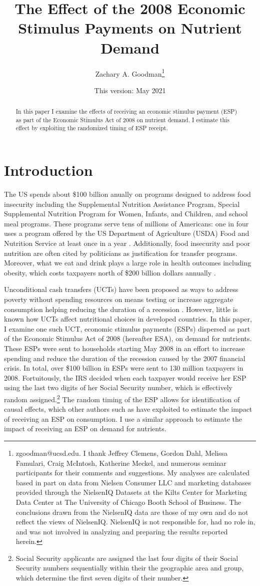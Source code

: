 \documentclass[12pt]{article}
\title{The Effect of the 2008 Economic Stimulus Payments on Nutrient Demand}
\author{Zachary A. Goodman\thanks{zgoodman@ucsd.edu.
I thank Jeffrey Clemens, Gordon Dahl, Melissa Famulari, Craig McIntosh, Katherine Meckel, and numerous seminar participants for their comments and suggestions.
My analyses are calculated based in part on data from Nielsen Consumer LLC and marketing databases provided through the NielsenIQ Datasets at the Kilts Center for Marketing Data Center at The University of Chicago Booth School of Business.
The conclusions drawn from the NielsenIQ data are those of my own and do not reflect the views of NielsenIQ.
NielsenIQ is not responsible for, had no role in, and was not involved in analyzing and preparing the results reported herein.}}
\affil{University of California, San Diego}
\date{This version: May 2021}
\begin{document}
\maketitle

\begin{abstract}
In this paper I examine the effects of receiving an economic stimulus payment (ESP) as part of the Economic Stimulus Act of 2008 on nutrient demand.
I estimate this effect by exploiting the randomized timing of ESP receipt.
\end{abstract}

\pagebreak

\doublespacing

\section{Introduction} \label{introduction}

The US spends about \$100 billion anually on programs designed to address food insecurity including the Supplemental Nutrition Assistance Program, Special Supplemental Nutrition Program for Women, Infants, and Children, and school meal programs.
These programs serve tens of millions of Americans: one in four uses a program offered by the US Department of Agriculture (USDA) Food and Nutrition Service at least once in a year \parencite{usdafns}.
Additionally, food insecurity and poor nutrition are often cited by politicians as justification for transfer programs.
Moreover, what we eat and drink plays a large role in health outcomes including obesity, which costs taxpayers north of \$200 billion dollars annually \parencite{cawley2012medical}.

Unconditional cash transfers (UCTs) have been proposed as ways to address poverty without spending resources on means testing \parencite{} or increase aggregate consumption helping reducing the duration of a recession \parencite{}.
However, little is known how UCTs affect nutritional choices in developed countries.
In this paper, I examine one such UCT, economic stimulus payments (ESPs) dispersed as part of the Economic Stimulus Act of 2008 (hereafter ESA), on demand for nutrients.
These ESPs were sent to households starting May 2008 in an effort to increase spending and reduce the duration of the recession caused by the 2007 financial crisis.
In total, over \$100 billion in ESPs were sent to 130 million taxpayers in 2008.
Fortuitously, the IRS decided when each taxpayer would receive her ESP using the last two digits of her Social Security number, which is effectively random assigned.\footnote{Social Security applicants are assigned the last four digits of their Social Security numbers sequentially within their the geographic area and group, which determine the first seven digits of their number.} The random timing of the ESP allows for identification of causal effects, which other authors such as \textcite{broda2014economic} have exploited to estimate the impact of receiving an ESP on consumption.
I use a similar approach to estimate the impact of receiving an ESP on demand for nutrients.
\end{document}
